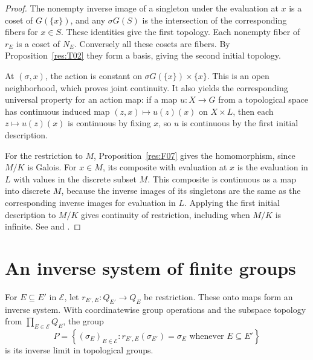 \begin{proof}
The nonempty inverse image of a singleton under the evaluation at \(x\)
is a coset of \(G(\{x\})\), and any \(\sigma G(S)\) is the intersection
of the corresponding fibers for \(x\in S\). These identities give the
first topology. Each nonempty fiber of \(r_E\) is a coset of \(N_E\).
Conversely all these cosets are fibers. By Proposition~\ref{res:T02}
they form a basis, giving the second initial topology.

At \((\sigma,x)\), the action is constant on
\(\sigma G(\{x\})\times\{x\}\). This is an open neighborhood, which
proves joint continuity. It also yields the corresponding universal
property for an action map: if a map \(u\colon X\to G\) from a
topological space has continuous induced map
\((z,x)\mapsto u(z)(x)\) on \(X\times L\), then each
\(z\mapsto u(z)(x)\) is continuous by fixing \(x\), so \(u\) is
continuous by the first initial description.

For the restriction to \(M\), Proposition~\ref{res:F07} gives the
homomorphism, since \(M/K\) is Galois. For \(x\in M\), its composite
with evaluation at \(x\) is the evaluation in \(L\) with values in the
discrete subset \(M\). This composite is continuous as a map into
discrete \(M\), because the inverse images of its singletons are
the same as the corresponding inverse images for evaluation in \(L\).
Applying the first initial description to \(M/K\) gives continuity
of restriction, including when \(M/K\) is infinite.
See \cite[Propositions 7.6--7.7]{milne} and
\cite[Tags 0BMJ and 0BMK]{stacks}.
\end{proof}

\section{An inverse system of finite groups}

\begin{proposition}\label{res:T04}
For \(E\subseteq E'\) in \(\mathcal E\), let
\(r_{E',E}\colon Q_{E'}\to Q_E\) be restriction. These onto maps
form an inverse system. With coordinatewise group operations and
the subspace topology from \(\prod_{E\in\mathcal E}Q_E\), the group
\[
 P=\left\{(\sigma_E)_{E\in\mathcal E} :
       r_{E',E}(\sigma_{E'})=\sigma_E
       \text{ whenever }E\subseteq E'\right\}
\]
is its inverse limit in topological groups.
\end{proposition}

